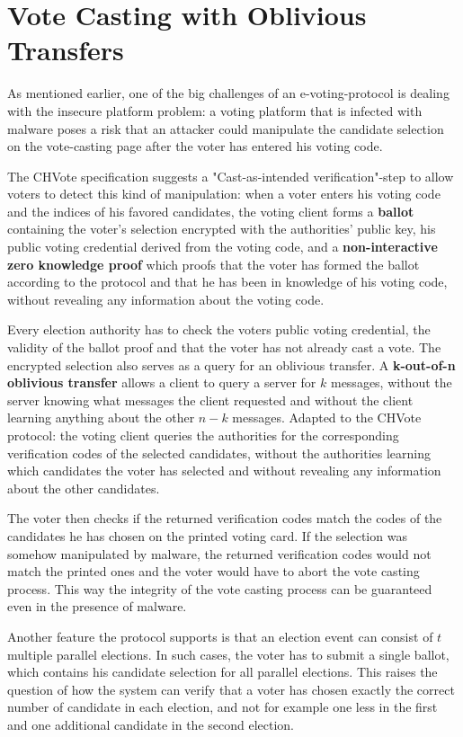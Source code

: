 \section{Vote Casting with Oblivious Transfers}
As mentioned earlier, one of the big challenges of an e-voting-protocol is dealing with the insecure platform problem: a voting platform that is infected with malware poses a risk that an attacker could manipulate the candidate selection on the vote-casting page after the voter has entered his voting code.

The CHVote specification suggests a "{}Cast-as-intended verification"{}-step to allow voters to detect this kind of manipulation: when a voter enters his voting code and the indices of his favored candidates, the voting client forms a \textbf{ballot} containing the voter's selection encrypted with the authorities' public key, his public voting credential derived from the voting code, and a \textbf{non-interactive zero knowledge proof} which proofs that the voter has formed the ballot according to the protocol and that he has been in knowledge of his voting code, without revealing any information about the voting code.

Every election authority has to check the voters public voting credential, the validity of the ballot proof and that the voter has not already cast a vote. The encrypted selection also serves as a query for an oblivious transfer. A \textbf{k-out-of-n oblivious transfer} allows a client to query a server for $k$ messages, without the server knowing what messages the client requested and without the client learning anything about the other $n-k$ messages. Adapted to the CHVote protocol: the voting client queries the authorities for the corresponding verification codes of the selected candidates, without the authorities learning which candidates the voter has selected and without revealing any information about the other candidates.

The voter then checks if the returned verification codes match the codes of the candidates he has chosen on the printed voting card. If the selection was somehow manipulated by malware, the returned verification codes would not match the printed ones and the voter would have to abort the vote casting process. This way the integrity of the vote casting process can be guaranteed even in the presence of malware.

Another feature the protocol supports is that an election event can consist of $t$ multiple parallel elections. In such cases, the voter has to submit a single ballot, which contains his candidate selection for all parallel elections. This raises the question of how the system can verify that a voter has chosen exactly the correct number of candidate in each election, and not for example one less in the first and one additional candidate in the second election.


